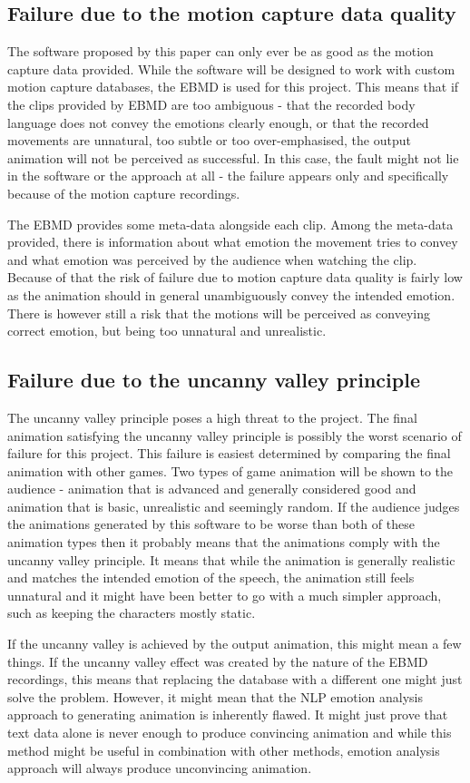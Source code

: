 \subsection{Failure due to the motion capture data quality}
The software proposed by this paper can only ever be as good as the motion capture data provided. While the software will be designed to work with custom motion capture databases, the EBMD is used for this project. This means that if the clips provided by EBMD are too ambiguous - that the recorded body language does not convey the emotions clearly enough, or that the recorded movements are unnatural, too subtle or too over-emphasised, the output animation will not be perceived as successful. In this case, the fault might not lie in the software or the approach at all - the failure appears only and specifically because of the motion capture recordings.

The EBMD provides some meta-data alongside each clip. Among the meta-data provided, there is information about what emotion the movement tries to convey and what emotion was perceived by the audience when watching the clip. Because of that the risk of failure due to motion capture data quality is fairly low as the animation should in general unambiguously convey the intended emotion. There is however still a risk that the motions will be perceived as conveying correct emotion, but being too unnatural and unrealistic.

\bigskip
\subsection{Failure due to the uncanny valley principle}
The uncanny valley principle poses a high threat to the project. The final animation satisfying the uncanny valley principle is possibly the worst scenario of failure for this project. This failure is easiest determined by comparing the final animation with other games. Two types of game animation will be shown to the audience - animation that is advanced and generally considered good and animation that is basic, unrealistic and seemingly random. If the audience judges the animations generated by this software to be worse than both of these animation types then it probably means that the animations comply with the uncanny valley principle. It means that while the animation is generally realistic and matches the intended emotion of the speech, the animation still feels unnatural and it might have been better to go with a much simpler approach, such as keeping the characters mostly static.

If the uncanny valley is achieved by the output animation, this might mean a few things. If the uncanny valley effect was created by the nature of the EBMD recordings, this means that replacing the database with a different one might just solve the problem. However, it might mean that the NLP emotion analysis approach to generating animation is inherently flawed. It might just prove that text data alone is never enough to produce convincing animation and while this method might be useful in combination with other methods, emotion analysis approach will always produce unconvincing animation.




